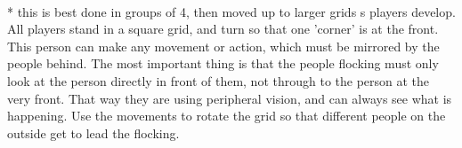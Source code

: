 \begin{minipage}{\textwidth}
\\*
this is best done in groups of 4, then moved up to larger grids s players develop.  All players stand in a square grid, and turn so that one 'corner' is at the front.  This person can make any movement or action, which must be mirrored by  the people behind.  The most important thing is that the people flocking must only look at the person directly in front of them, not through to the person at the very front.  That way they are using peripheral vision, and can always see what is happening.  Use the movements to rotate the grid so that different people on the outside get to lead the flocking.
\end{minipage}    \vfill
